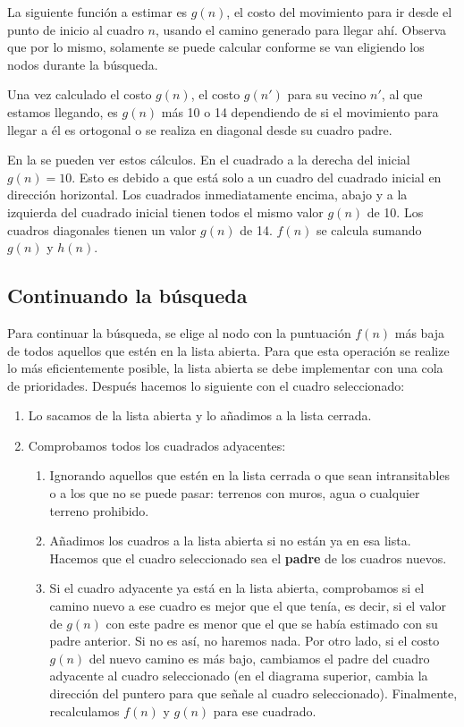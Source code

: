 La siguiente función a estimar es \(g(n)\), el costo del movimiento para ir desde el punto de inicio al cuadro \(n\), usando el camino generado para llegar ahí.  Observa que por lo mismo, solamente se puede calcular conforme se van eligiendo los nodos durante la búsqueda.

Una vez calculado el costo \(g(n)\), el costo \(g(n')\) para su vecino $n'$, al que estamos llegando, es \(g(n)\) más 10 o 14 dependiendo de si el movimiento para llegar a él es ortogonal o se realiza en diagonal desde su cuadro padre.

En la  se pueden ver estos cálculos.  En el cuadrado a la derecha del inicial \(g(n)=10\). Esto es debido a que está solo a un cuadro del cuadrado inicial en dirección horizontal. Los cuadrados inmediatamente encima, abajo y a la izquierda del cuadrado inicial tienen todos el mismo valor \(g(n)\) de 10. Los cuadros diagonales tienen un valor \(g(n)\) de 14.  \(f(n)\) se calcula sumando \(g(n)\) y \(h(n)\).


\subsection{Continuando la b\'usqueda}

Para continuar la búsqueda, se elige al nodo con la puntuación \(f(n)\) más baja de todos aquellos que estén en la lista abierta. Para que esta operación se realize lo más eficientemente posible, la lista abierta se debe implementar con una cola de prioridades. Después hacemos lo siguiente con el cuadro seleccionado:

\begin{enumerate}
  \item Lo sacamos de la lista abierta y lo añadimos a la lista cerrada.  

  \item Comprobamos todos los cuadrados adyacentes:
  
  \begin{enumerate}
   \item Ignorando aquellos que estén en la lista cerrada o que sean intransitables o a los que no se puede pasar: terrenos con muros, agua o cualquier terreno prohibido.
   
   \item Añadimos los cuadros a la lista abierta si no están ya en esa lista. Hacemos que el cuadro seleccionado sea el \textbf{padre} de los cuadros nuevos.
   
   \item Si el cuadro adyacente ya está en la lista abierta, comprobamos si el camino nuevo a ese cuadro es mejor que el que tenía, es decir, si el valor de \(g(n)\) con este padre es menor que el que se había estimado con su padre anterior. Si no es así, no haremos nada. Por otro lado, si el costo \(g(n)\) del nuevo camino es más bajo, cambiamos el padre del cuadro adyacente al cuadro seleccionado (en el diagrama superior, cambia la dirección del puntero para que señale al cuadro seleccionado). Finalmente, recalculamos \(f(n)\) y \(g(n)\) para ese cuadrado.
  \end{enumerate}
\end{enumerate}


